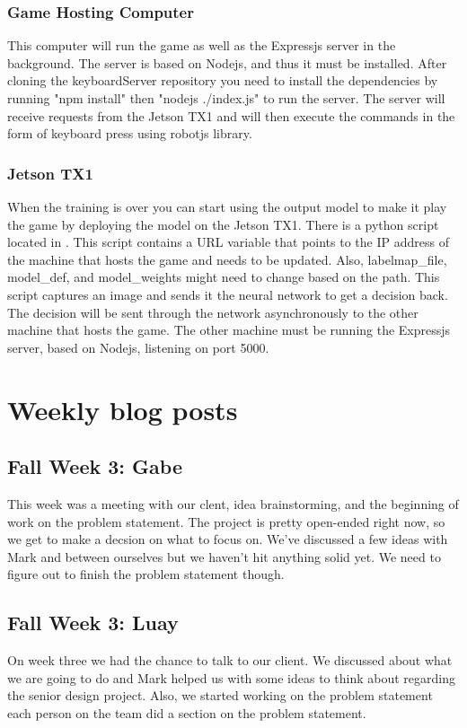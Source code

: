 \documentclass[onecolumn, draftclsnofoot,10pt, compsoc]{IEEEtran}
\begin{document}
\subsubsection{Game Hosting Computer}

This computer will run the game as well as the Expressjs server in the background.
The server is based on Nodejs, and thus it must be installed.
After cloning the keyboardServer repository you need to install the dependencies by running "npm install" then "nodejs ./index.js" to run the server.
The server will receive requests from the Jetson TX1 and will then execute the commands in the form of keyboard press using robot\-js library.

\subsubsection{Jetson TX1}

When the training is over you can start using the output model to make it play the game by deploying the model on the Jetson TX1.
There is a python script located in .
This script contains a URL variable that points to the IP address of the machine that hosts the game and needs to be updated.
Also, labelmap\_file, model\_def, and model\_weights might need to change based on the path. 
This script captures an image and sends it the neural network to get a decision back.
The decision will be sent through the network asynchronously to the other machine that hosts the game.
The other machine must be running the Expressjs server, based on Nodejs, listening on port 5000.

\section{Weekly blog posts}
\subsection{Fall Week 3: Gabe}
This week was a meeting with our clent, idea brainstorming, and the beginning of work on the problem statement. The project is pretty open-ended right now, so we get to make a decsion on what to focus on. We've discussed a few ideas with Mark and between ourselves but we haven't hit anything solid yet. We need to figure out to finish the problem statement though.
\subsection{Fall Week 3: Luay}
On week three we had the chance to talk to our client. We discussed about what we are going to do and Mark helped us with some ideas to think about regarding the senior design project. Also, we started working on the problem statement each person on the team did a section on the problem statement.
\end{document}
